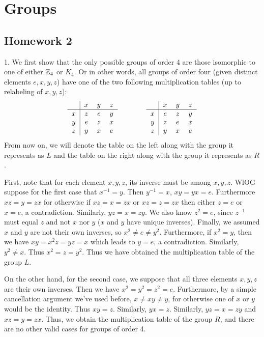 \section{Groups}

\subsection{Homework 2}

1. We first show that the only possible groups of order 4 are those isomorphic to one of either $\mathbb{Z}_4$ or $K_4$. Or in other words, all groups of order four (given distinct elements $e, x, y, z$) have one of the two following multiplication tables (up to relabeling of $x, y, z$):
\[
\begin{tabular}{c|ccc}
    & $x$ & $y$ & $z$ \\
\hline
$x$ & $z$ & $e$ & $y$ \\
$y$ & $e$ & $z$ & $x$ \\
$z$ & $y$ & $x$ & $e$
\end{tabular}
\quad\quad\quad\quad
\begin{tabular}{c|ccc}
    & $x$ & $y$ & $z$ \\
\hline
$x$ & $e$ & $z$ & $y$ \\
$y$ & $z$ & $e$ & $x$ \\
$z$ & $y$ & $x$ & $e$
\end{tabular}
\]
From now on, we will denote the table on the left along with the group it represents as $L$ and the table on the right along with the group it represents as $R$.

First, note that for each element $x, y, z$, its inverse must be among $x, y, z$. WlOG suppose for the first case that $x^{-1} = y$. Then $y^{-1} = x$, $xy = yx = e$. Furthermore $xz = y = zx$ for otherwise if $xz = x = zx$ or $xz = z = zx$ then either $z = e$ or $x = e$, a contradiction. Similarly, $yz = x = zy$. We also know $z^2 = e$, since $z^{-1}$ must equal $z$ and not $x$ nor $y$ ($x$ and $y$ have unique inverses). Finally, we assumed $x$ and $y$ are not their own inverses, so $x^2 \neq e \neq y^2$. Furthermore, if $x^2 = y$, then we have $xy = x^2z = yz = x$ which leads to $y = e$, a contradiction. Similarly, $y^2 \neq x$. Thus $x^2 = z = y^2$. Thus we have obtained the multiplication table of the group $L$. 

On the other hand, for the second case, we suppose that all three elements $x, y, z$ are their own inverses. Then we have $x^2 = y^2 = z^2 = e$. Furthermore, by a simple cancellation argument we've used before, $x \neq xy \neq y$, for otherwise one of $x$ or $y$ would be the identity. Thus $xy = z$. Similarly, $yx = z$. Similarly, $yz = x = zy$ and $xz = y = zx$. Thus, we obtain the multiplication table of the group $R$, and there are no other valid cases for groups of order 4.

